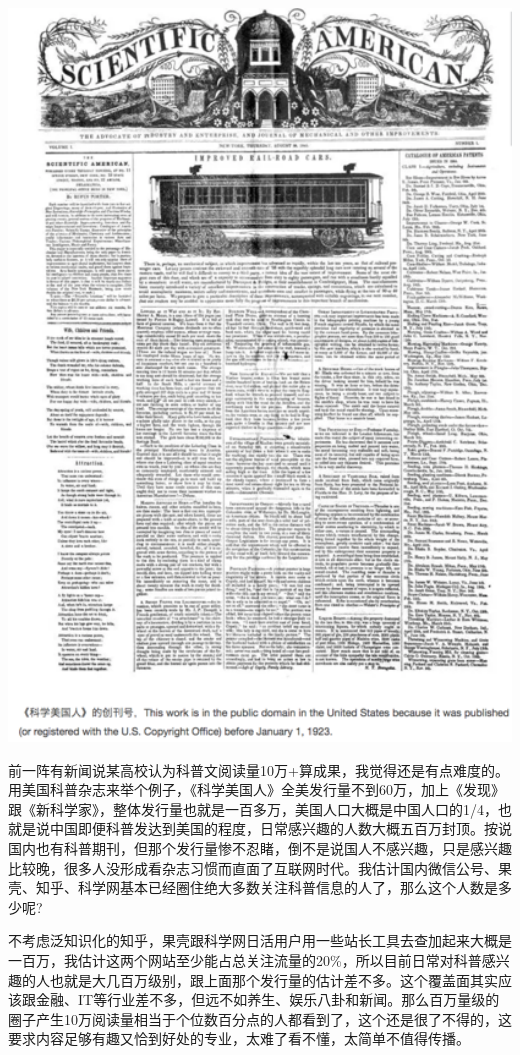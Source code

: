 \documentclass[
]{book}
\begin{document}
\includegraphics[width=5.72in]{images/pops1}

前一阵有新闻说某高校认为科普文阅读量10万+算成果，我觉得还是有点难度的。用美国科普杂志来举个例子，《科学美国人》全美发行量不到60万，加上《发现》跟《新科学家》，整体发行量也就是一百多万，美国人口大概是中国人口的1/4，也就是说中国即便科普发达到美国的程度，日常感兴趣的人数大概五百万封顶。按说国内也有科普期刊，但那个发行量惨不忍睹，倒不是说国人不感兴趣，只是感兴趣比较晚，很多人没形成看杂志习惯而直面了互联网时代。我估计国内微信公号、果壳、知乎、科学网基本已经圈住绝大多数关注科普信息的人了，那么这个人数是多少呢?

不考虑泛知识化的知乎，果壳跟科学网日活用户用一些站长工具去查加起来大概是一百万，我估计这两个网站至少能占总关注流量的20\%，所以目前日常对科普感兴趣的人也就是大几百万级别，跟上面那个发行量的估计差不多。这个覆盖面其实应该跟金融、IT等行业差不多，但远不如养生、娱乐八卦和新闻。那么百万量级的圈子产生10万阅读量相当于个位数百分点的人都看到了，这个还是很了不得的，这要求内容足够有趣又恰到好处的专业，太难了看不懂，太简单不值得传播。
\end{document}
